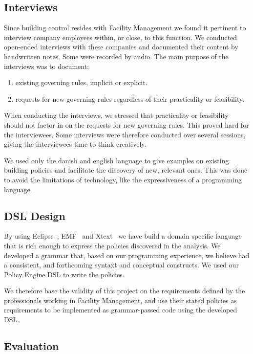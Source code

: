 \documentclass{llncs}
\begin{document}
\subsection{Interviews}\label{subsec:interviews}
Since building control resides with Facility Management we found it pertinent to interview company employees within, or close, to this function. We conducted open-ended interviews with these companies and documented their content by handwritten notes. Some were recorded by audio. The main purpose of the interviews was to document;

\begin{enumerate}
	\item existing governing rules, implicit or explicit.
	\item requests for new governing rules regardless of their practicality or feasibility.
\end{enumerate}

When conducting the interviews, we stressed that practicality or feasibility should not factor in on the requests for new governing rules. This proved hard for the interviewees. Some interviews were therefore conducted over several sessions, giving the interviewees time to think creatively. 

We used only the danish and english language to give examples on existing building policies and facilitate the discovery of new, relevant ones. This was done to avoid the limitations of technology, like the expressiveness of a programming language. 

\subsection{DSL Design}\label{subsec:dsldesign}
By using Eclipse~\cite{eclipse}, EMF~\cite{emf} and Xtext~\cite{xtext} we have build a domain specific language that is rich enough to express the policies discovered in the analysis. We developed a grammar that, based on our programming experience, we believe had a consistent, and forthcoming syntaxt and conceptual constructs. We used our Policy Engine DSL to write the policies.

We therefore base the validity of this project on the requirements defined by the professionals working in Facility Management, and use their stated policies as requirements to be implemented as grammar-passed code using the developed DSL.

\subsection{Evaluation}\label{subsec:method-evaluation}
\end{document}
